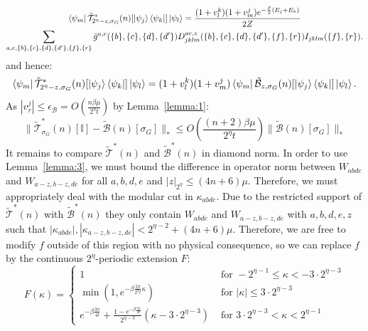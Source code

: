 \documentclass[aps,floatfix,10pt,amssymb,amsfont,amsmath,superscriptaddress,float,nofootinbib,longbibliography,nobalancelastpage,twocolumn]{revtex4-2}
\begin{document}
\begin{multline}
         \bra{\psi_m}\tilde{\mathcal{T}}^*_{2^{\eta} -z,\sigma_G}(n)[\ket{\psi_j}\bra{\psi_k}]\ket{\psi_l} = \frac{(1+v_l^k)(1+v_m^j)e^{-\frac{\beta}{2}(E_j+E_k)}}{2Z}\\\sum_{a,e,\{b\},\{c\},\{d\},\{d'\},\{f\},\{r\}} \bar g^{a,e}(\{b\},\{c\},\{d\},\{d'\}) D^{ae,z}_{jklm}(\{b\},\{c\},\{d\},\{d'\},\{f\},\{r\})I_{jklm}(\{f\},\{r\}).
     \label{eq:relabelline-symmetrized}
\end{multline}
and hence:
\begin{equation}
    \bra{\psi_m}\tilde{\mathcal{T}}^*_{2^{\eta} -z,\sigma_G}(n)[\ket{\psi_j}\bra{\psi_k}]\ket{\psi_l}
    =(1+v_l^k)(1+v_m^j)\bra{\psi_m}\tilde{\mathcal{B}}_{z,\sigma_G}(n)[\ket{\psi_j}\bra{\psi_k}]\ket{\psi_l}.
\end{equation}
As $|v_r^j| \leq \epsilon_{\mathcal{B}} = O(\frac{n\beta \mu}{2^{\eta}t})$ by Lemma~\ref{lemma:1}:
\begin{equation}
    \|\tilde{\mathcal{T}}^*_{\sigma_G}(n)[\mathbb{I}] - \tilde{\mathcal{B}}(n)[\sigma_G]\|_* \leq O\left(\frac{(n+2)\beta \mu}{2^{\eta}t}\right)\|\tilde{\mathcal{B}}(n)[\sigma_G]\|_*
    \label{eq:Boutput}
\end{equation}
It remains to compare $\tilde{\mathcal{T}}^*(n)$ and $\tilde{\mathcal{B}}^*(n)$ in diamond norm. In order to use Lemma~\ref{lemma:3}, we must bound the difference in operator norm between $W_{abde}$ and $W_{a-z,b-z,de}$ for all $a,b,d,e$ and $|z|_{2^{\eta}} \leq (4n+6)\mu$. Therefore, we must appropriately deal with the modular cut in $\kappa_{abde}$. Due to the restricted support of $\tilde{\mathcal{T}}^*(n)$ with $\tilde{\mathcal{B}}^*(n)$ they only contain $W_{abde}$ and $W_{a-z,b-z,de}$ with $a,b,d,e, z$ such that $|\kappa_{abde}|,|\kappa_{a-z,b-z,de}| < 2^{\eta-2}+(4n+6)\mu$. Therefore, we are free to modify $f$ outside of this region with no physical consequence, so we can replace $f$ by the continuous $2^{\eta}$-periodic extension $F$:
\begin{equation}
    F(\kappa) = \begin{cases}1& \text{ for }  -2^{\eta-1} \leq \kappa <  -3\cdot 2^{\eta-3}\\
        \min(1,e^{-\beta \frac{2\pi}{2^{\eta}t} \kappa}) & \text{ for } |\kappa|\leq 3\cdot 2^{\eta-3}\\
        e^{-\beta\frac{3\pi}{4t}} + \frac{1- e^{-\beta\frac{3\pi}{4t}}}{2^{\eta-3}}(\kappa - 3\cdot 2^{\eta-3}) & \text{ for }  3\cdot 2^{\eta-3} < \kappa <  2^{\eta-1}
    \end{cases}
\end{equation}
\end{document}
